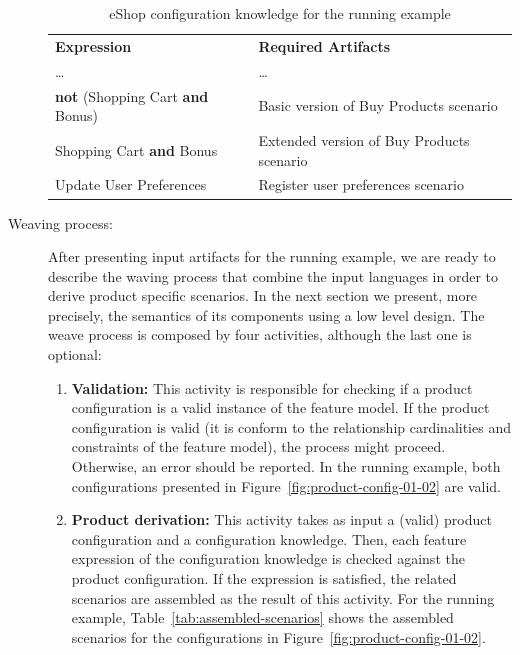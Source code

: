 \documentclass{acm_proc_article-sp}
\begin{document}
\begin{description}
\begin{table}[h]
\begin{center}
\caption{eShop configuration knowledge for the running example} \label{tab:eshop-running-example}
\begin{tabular}{ll}
   \hline\noalign{\smallskip}
  {\bf Expression} & {\bf Required Artifacts} \\
   \noalign{\smallskip}
   \hline
   \noalign{\smallskip}
    \ldots & \ldots \\
    {\bf not} (Shopping Cart {\bf and} Bonus)\hspace{2pt} & Basic version of Buy Products scenario \\
    Shopping Cart {\bf and} Bonus & Extended version of Buy Products scenario \\
    Update User Preferences & Register user preferences scenario	 \\       
  \hline
\end{tabular}
\end{center}
\end{table}

\item[Weaving process:] After presenting input artifacts for the running example, we are ready to describe the waving process that combine 
the input languages in order to derive product specific scenarios. In the next section we present, more precisely, the semantics of its components using a low level design. The weave process is composed by four activities, although the last one is optional: 

\begin{enumerate}
\item {\bf Validation:} This activity is responsible for checking if a product configuration is a valid instance of the feature model. If the product configuration is 
valid (it is conform to the relationship cardinalities and constraints of the feature model), the process might proceed. Otherwise, an error should be reported. In the running example, both configurations presented in Figure~\ref{fig:product-config-01-02} are valid. 

\item {\bf Product derivation:} This activity takes as input a (valid) product configuration and a configuration knowledge. Then, each feature expression of the 
configuration knowledge is checked against the product configuration. If the expression is satisfied, the related scenarios are assembled as the result of 
this activity. For the running example, Table~\ref{tab:assembled-scenarios} shows the assembled scenarios for the configurations in  
Figure~\ref{fig:product-config-01-02}.


\end{enumerate}
\end{description}
\end{document}
